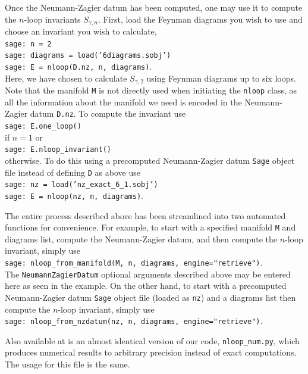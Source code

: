 \documentclass[12pt]{amsart}
\theoremstyle{definition}
\begin{document}
Once the Neumann-Zagier datum has been computed, one may use it to 
compute the $n$-loop invariants $S_{\gamma,n}$. First, load the Feynman
diagrams you wish to use and choose an invariant you wish to calculate,\\
\indent \texttt{sage: n = 2}\\
\indent \texttt{sage: diagrams = load('6diagrams.sobj')}\\
\indent \texttt{sage: E = nloop(D.nz, n, diagrams)}.\\
Here, we have chosen to calculate $S_{\gamma,2}$ using Feynman
diagrams up to six loops. Note that the manifold \texttt{M} is not directly 
used when initiating the \texttt{nloop} class, as all the information about 
the manifold we
need is encoded in the Neumann-Zagier datum \texttt{D.nz}. To compute the
invariant use\\
\indent \texttt{sage: E.one\_loop()}\\
if $n = 1$ or\\
\indent \texttt{sage: E.nloop\_invariant()}\\
otherwise. To do this using a precomputed Neumann-Zagier datum \texttt{Sage}
object file instead of defining \texttt{D} as above use\\
\indent \texttt{sage: nz = load('nz\_exact\_6\_1.sobj')}\\
\indent \texttt{sage: E = nloop(nz, n, diagrams)}.

The entire process described above has been streamlined into two automated
functions for convenience. For example, to start with a specified manifold 
\texttt{M} and diagrams list, compute the Neumann-Zagier datum, and then 
compute the $n$-loop invariant, simply use\\
\indent \texttt{sage: nloop\_from\_manifold(M, n, diagrams, 
engine="retrieve")}.\\
The \texttt{NeumannZagierDatum} optional arguments described above may be
entered here as seen in the example. On the other hand, to start with a
precomputed Neumann-Zagier datum \texttt{Sage} object file (loaded as 
\texttt{nz}) and a diagrams list then compute the $n$-loop invariant, simply 
use\\
\indent 
\texttt{sage: nloop\_from\_nzdatum(nz, n, diagrams,  engine="retrieve")}.

Also available at \cite{nloop-compute} is an almost identical version of our 
code, \texttt{nloop\_num.py}, which produces numerical results to arbitrary 
precision instead of exact computations. The usage for this file is the same.
\end{document}

